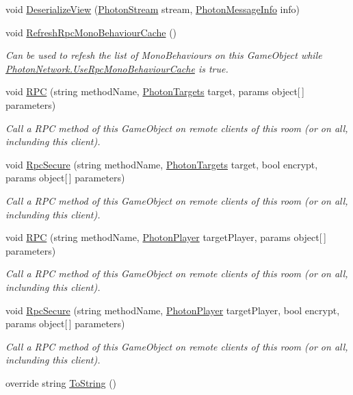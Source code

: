\begin{DoxyCompactItemize}
void \hyperlink{class_photon_view_a677557c203df8f79277095ce5f9da001}{Deserialize\+View} (\hyperlink{class_photon_stream}{Photon\+Stream} stream, \hyperlink{class_photon_message_info}{Photon\+Message\+Info} info)
\item 
void \hyperlink{class_photon_view_a869710e081df022bbb4fa160e7ab9e0a}{Refresh\+Rpc\+Mono\+Behaviour\+Cache} ()
\begin{DoxyCompactList}\small\item\em Can be used to refesh the list of Mono\+Behaviours on this Game\+Object while \hyperlink{class_photon_network_a2ea887525d418e088bf99d303673d2f3}{Photon\+Network.\+Use\+Rpc\+Mono\+Behaviour\+Cache} is true. \end{DoxyCompactList}\item 
void \hyperlink{class_photon_view_ad288db13a15d581e0f7c5886f4036720}{R\+PC} (string method\+Name, \hyperlink{group__public_api_gab84b274b6aa3b3a3d7810361da16170f}{Photon\+Targets} target, params object\mbox{[}$\,$\mbox{]} parameters)
\begin{DoxyCompactList}\small\item\em Call a R\+PC method of this Game\+Object on remote clients of this room (or on all, inclunding this client). \end{DoxyCompactList}\item 
void \hyperlink{class_photon_view_a2950cb34198fa050a7e65a6b2f722c68}{Rpc\+Secure} (string method\+Name, \hyperlink{group__public_api_gab84b274b6aa3b3a3d7810361da16170f}{Photon\+Targets} target, bool encrypt, params object\mbox{[}$\,$\mbox{]} parameters)
\begin{DoxyCompactList}\small\item\em Call a R\+PC method of this Game\+Object on remote clients of this room (or on all, inclunding this client). \end{DoxyCompactList}\item 
void \hyperlink{class_photon_view_a6bc9726af14a8c7b8bdd7793c495a6e8}{R\+PC} (string method\+Name, \hyperlink{class_photon_player}{Photon\+Player} target\+Player, params object\mbox{[}$\,$\mbox{]} parameters)
\begin{DoxyCompactList}\small\item\em Call a R\+PC method of this Game\+Object on remote clients of this room (or on all, inclunding this client). \end{DoxyCompactList}\item 
void \hyperlink{class_photon_view_ab6f075ebed73c05fa1c9ea6e81b66cca}{Rpc\+Secure} (string method\+Name, \hyperlink{class_photon_player}{Photon\+Player} target\+Player, bool encrypt, params object\mbox{[}$\,$\mbox{]} parameters)
\begin{DoxyCompactList}\small\item\em Call a R\+PC method of this Game\+Object on remote clients of this room (or on all, inclunding this client). \end{DoxyCompactList}\item 
override string \hyperlink{class_photon_view_aaa61ad448b005df342350762476e367d}{To\+String} ()
\end{DoxyCompactItemize}
